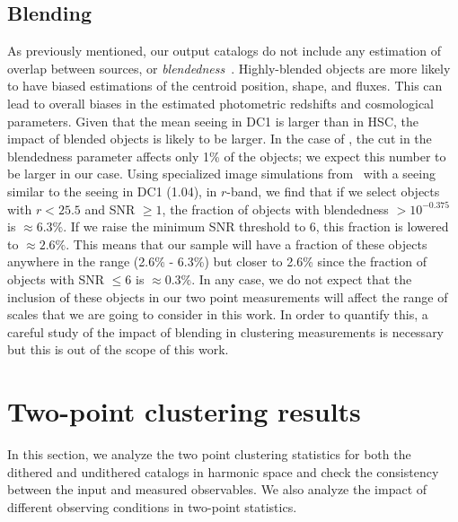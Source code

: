 \documentclass[twocolumn]{aastex62}
\begin{document}
\subsection{Blending}
As previously mentioned, our output catalogs do not include any estimation of overlap between sources, or \textit{blendedness}~\citep{2018PASJ...70S...5B}. Highly-blended objects are more likely to have biased estimations of the centroid position, shape, and fluxes. This can lead to overall biases in the estimated photometric redshifts and cosmological parameters. Given that the mean seeing in DC1 is larger than in HSC, the impact of blended objects is likely to be larger. In the case of \citet{2018PASJ...70S..25M}, the cut in the blendedness parameter affects only 1\% of the objects; we expect this number to be larger in our case. Using specialized image simulations from~\citet{Sanchez19} with a seeing similar to the seeing in DC1 (1.04\arcsec), in $r$-band, we find that if we select objects with $r < 25.5$ and SNR $\geq 1$, the fraction of objects with blendedness $ >10^{-0.375}$ is $\approx 6.3\%$. If we raise the minimum SNR threshold to 6, this fraction is lowered to $\approx 2.6\%$. This means that our sample will have a fraction of these objects anywhere in the range (2.6\% - 6.3\%) but closer to 2.6\% since the fraction of objects with SNR $\leq 6$ is $\approx 0.3\%$. In any case, we do not expect that the inclusion of these objects in our two point measurements will affect the range of scales that we are going to consider in this work. In order to quantify this, a careful study of the impact of blending in clustering measurements is necessary but this is out of the scope of this work.


\section{Two-point clustering results}
\label{sec:results}

In this section, we analyze the two point clustering statistics for both the dithered and undithered catalogs in harmonic space and check the consistency between the input and measured observables. We also analyze the impact of different observing conditions in two-point statistics. 
\end{document}
